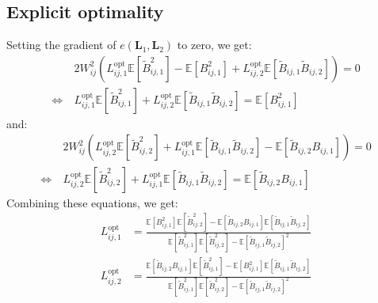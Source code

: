 \documentclass[12pt]{scrartcl}
\begin{document}
\subsection{Explicit optimality}
Setting the gradient of $e(\mathbf{L}_1,\mathbf{L}_2)$ to zero, we get:
\begin{align}
\label{eq:de_th_1}
& 2 W_{ij}^2 \left(L_{ij,1}^\mathrm{opt} \mathbb{E}\left[\widetilde{B}_{ij,1}^2\right] - \mathbb{E} \left[B^2_{ij,1}\right] + L_{ij,2}^\mathrm{opt} \mathbb{E} \left[\widetilde{B}_{ij,1} \widetilde{B}_{ij,2}\right] \right) = 0 \nonumber \\
\Leftrightarrow \ & L_{ij,1}^\mathrm{opt} \mathbb{E}\left[\widetilde{B}_{ij,1}^2\right] + L_{ij,2}^\mathrm{opt} \mathbb{E} \left[\widetilde{B}_{ij,1} \widetilde{B}_{ij,2}\right] = \mathbb{E} \left[B^2_{ij,1}\right]
\end{align}
and:
\begin{align}
\label{eq:de_th_2}
& 2 W_{ij}^2 \left(L_{ij,2}^\mathrm{opt} \mathbb{E}\left[\widetilde{B}_{ij,2}^2\right] + L_{ij,1}^\mathrm{opt} \mathbb{E} \left[\widetilde{B}_{ij,1} \widetilde{B}_{ij,2}\right] - \mathbb{E} \left[\widetilde{B}_{ij,2} B_{ij,1}\right] \right) = 0 \nonumber \\
\Leftrightarrow \ & L_{ij,2}^\mathrm{opt} \mathbb{E}\left[\widetilde{B}_{ij,2}^2\right] + L_{ij,1}^\mathrm{opt} \mathbb{E} \left[\widetilde{B}_{ij,1} \widetilde{B}_{ij,2}\right] = \mathbb{E} \left[\widetilde{B}_{ij,2} B_{ij,1}\right] 
\end{align}
Combining these equations, we get:
\begin{subequations}
\label{eq:de_th}
\begin{align}
L_{ij,1}^\mathrm{opt} & = \frac{\mathbb{E} \left[B^2_{ij,1}\right] \mathbb{E} \left[\widetilde{B}_{ij,2}^2\right] - \mathbb{E} \left[\widetilde{B}_{ij,2} B_{ij,1}\right] \mathbb{E} \left[\widetilde{B}_{ij,1} \widetilde{B}_{ij,2}\right] }{\mathbb{E} \left[\widetilde{B}_{ij,1}^2\right] \mathbb{E} \left[\widetilde{B}_{ij,2}^2\right] - \mathbb{E} \left[\widetilde{B}_{ij,1} \widetilde{B}_{ij,2}\right]^2} \\
L_{ij,2}^\mathrm{opt} & = \frac{\mathbb{E} \left[\widetilde{B}_{ij,2} B_{ij,1}\right] \mathbb{E} \left[\widetilde{B}_{ij,1}^2\right] - \mathbb{E} \left[B^2_{ij,1}\right] \mathbb{E} \left[\widetilde{B}_{ij,1} \widetilde{B}_{ij,2}\right]}{\mathbb{E} \left[\widetilde{B}_{ij,1}^2\right] \mathbb{E} \left[\widetilde{B}_{ij,2}^2\right] - \mathbb{E} \left[\widetilde{B}_{ij,1} \widetilde{B}_{ij,2}\right]^2}
\end{align}
\end{subequations}
\end{document}
